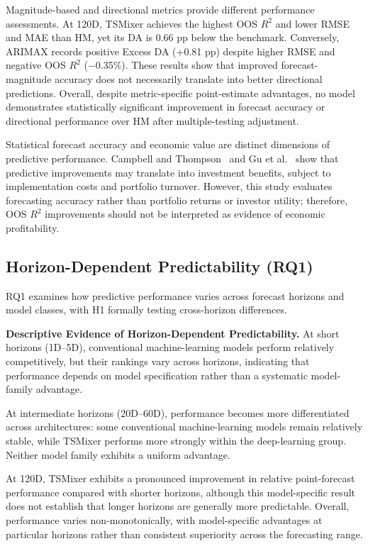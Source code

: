 \documentclass[runningheads,orivec]{llncs}
\begin{document}
Magnitude-based and directional metrics provide different performance assessments. At 120D, TSMixer achieves the highest OOS $R^2$ and lower RMSE and MAE than HM, yet its DA is 0.66 pp below the benchmark. Conversely, ARIMAX records positive Excess DA (+0.81 pp) despite higher RMSE and negative OOS $R^2$ ($-$0.35\%). These results show that improved forecast-magnitude accuracy does not necessarily translate into better directional predictions. Overall, despite metric-specific point-estimate advantages, no model demonstrates statistically significant improvement in forecast accuracy or directional performance over HM after multiple-testing adjustment.

Statistical forecast accuracy and economic value are distinct dimensions of predictive performance. Campbell and Thompson~\cite{campbell2008} and Gu et al.~\cite{gu2020} show that predictive improvements may translate into investment benefits, subject to implementation costs and portfolio turnover. However, this study evaluates forecasting accuracy rather than portfolio returns or investor utility; therefore, OOS $R^2$ improvements should not be interpreted as evidence of economic profitability.

\subsection{Horizon-Dependent Predictability (RQ1)}

RQ1 examines how predictive performance varies across forecast horizons and model classes, with H1 formally testing cross-horizon differences.

\noindent\textbf{Descriptive Evidence of Horizon-Dependent Predictability.} At short horizons (1D--5D), conventional machine-learning models perform relatively competitively, but their rankings vary across horizons, indicating that performance depends on model specification rather than a systematic model-family advantage.

At intermediate horizons (20D--60D), performance becomes more differentiated across architectures: some conventional machine-learning models remain relatively stable, while TSMixer performs more strongly within the deep-learning group. Neither model family exhibits a uniform advantage.

At 120D, TSMixer exhibits a pronounced improvement in relative point-forecast performance compared with shorter horizons, although this model-specific result does not establish that longer horizons are generally more predictable. Overall, performance varies non-monotonically, with model-specific advantages at particular horizons rather than consistent superiority across the forecasting range.
\end{document}
